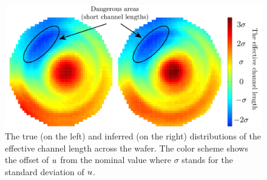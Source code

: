 \begin{figure}[b!]
  \vspace{-1.5em}
  \centering
  \includegraphics[width=1.0\linewidth]{include/figures/wafer-qoi.pdf}
  \vspace{-0.5em}
  \caption{The true (on the left) and inferred (on the right) distributions of the effective channel length across the wafer. The color scheme shows the offset of $u$ from the nominal value where $\sigma$ stands for the standard deviation of $u$.}
  \vspace{-1.0em}
\end{figure}
